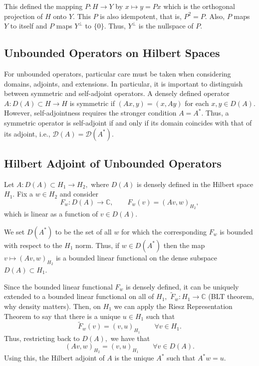 \documentclass[12pt,a4paper]{article}
\theoremstyle{boldthm}
\theoremstyle{bolddefn}
\begin{document}
This defined the mapping $P : H \rightarrow Y$ by $x\mapsto y = Px$ which is the orthogonal projection of $H$ onto $Y.$ This $P$ is also idempotent, that is, $P^2 = P.$ Also, $P$ maps $Y$ to itself and $P$ maps $Y^\perp$ to $\{0\}.$ Thus, $Y^\perp$ is the nullspace of $P.$ 

\subsection{Unbounded Operators on Hilbert Spaces}


For unbounded operators, particular care must be taken when considering domains, adjoints, and extensions. In particular, it is important to distinguish between symmetric and self-adjoint operators. A densely defined operator $A: D(A) \subset H \rightarrow H$ is symmetric if $(Ax, y) = (x, Ay)$ for each $x, y \in D(A)$. However, self-adjointness requires the stronger condition $A=A^*$. Thus, a symmetric operator is self-adjoint if and only if its domain coincides with that of its adjoint, i.e., $\mathcal{D}(A)=\mathcal{D}(A^*)$.


\subsection{Hilbert Adjoint of Unbounded Operators}

Let $A : D(A) \subset H_1 \rightarrow H_2,$ where $D(A)$ is densely defined in the Hilbert space $H_1.$ Fix a $w \in H_2$ and consider 
\begin{equation}
    F_w : D(A) \rightarrow \mathbb{C}, \qquad F_w(v) = (Av, w)_{H_2},
\end{equation}
which is linear as a function of $v \in D(A).$  

We set $D(A^*)$ to be the set of all $w$ for which the corresponding $F_w$ is bounded with respect to the $H_1$ norm. Thus, if $w \in D(A^*)$ then the map $v \mapsto (Av, w)_{H_2}$ is a bounded linear functional on the dense subspace $D(A) \subset H_1.$ 

Since the bounded linear functional $F_w$ is densely defined, it can be uniquely extended to a bounded linear functional on all of $H_1,$ $\tilde F_w : H_1 \rightarrow \mathbb{C}$ (BLT theorem, why density matters). Then, on $H_1$ we can apply the Riesz Representation Theorem to say that there is a unique $u \in H_1$ such that
\begin{equation}
    \tilde F_w(v) = (v, u)_{H_1} \qquad \forall v \in H_1. 
\end{equation}
Thus, restricting back to $D(A),$ we have that 
\begin{equation}
    (Av, w)_{H_2} = (v, u)_{H_1} \qquad \forall v \in D(A). 
\end{equation}
Using this, the Hilbert adjoint of $A$ is the unique $A^*$ such that $A^*w = u.$
\end{document}
